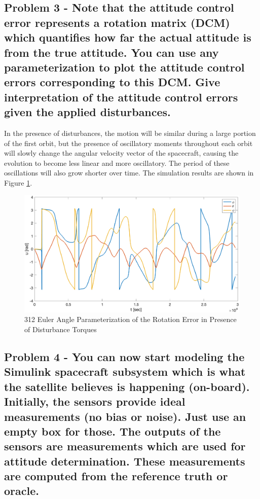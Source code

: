 \subsection{Problem 3 - Note that the attitude control error represents a rotation matrix (DCM) which quantifies how far the actual attitude is from the true attitude. You can use any parameterization to plot the attitude control errors corresponding to this DCM. Give interpretation of the attitude control errors given the applied disturbances.}

In the presence of disturbances, the motion will be similar during a large portion of the first orbit, but the presence of oscillatory moments throughout each orbit will slowly change the angular velocity vector of the spacecraft, causing the evolution to become less linear and more oscillatory. The period of these oscillations will also grow shorter over time. The simulation results are shown in Figure \ref{fig:attitude_error_dist}.

\begin{figure}[H]
    \centering
    \captionsetup{ justification = centering }
    \includegraphics[width = 12cm]{Images/PS6/attitude_error_dist.png}
    \caption{312 Euler Angle Parameterization of the Rotation Error in Presence of Disturbance Torques}
    \label{fig:attitude_error_dist}
\end{figure}

\subsection{Problem 4 - You can now start modeling the Simulink spacecraft subsystem which is what the satellite believes is happening (on-board). Initially, the sensors provide ideal measurements (no bias or noise). Just use an empty box for those. The outputs of the sensors are measurements which are used for attitude determination. These measurements are computed from the reference truth or oracle.}

